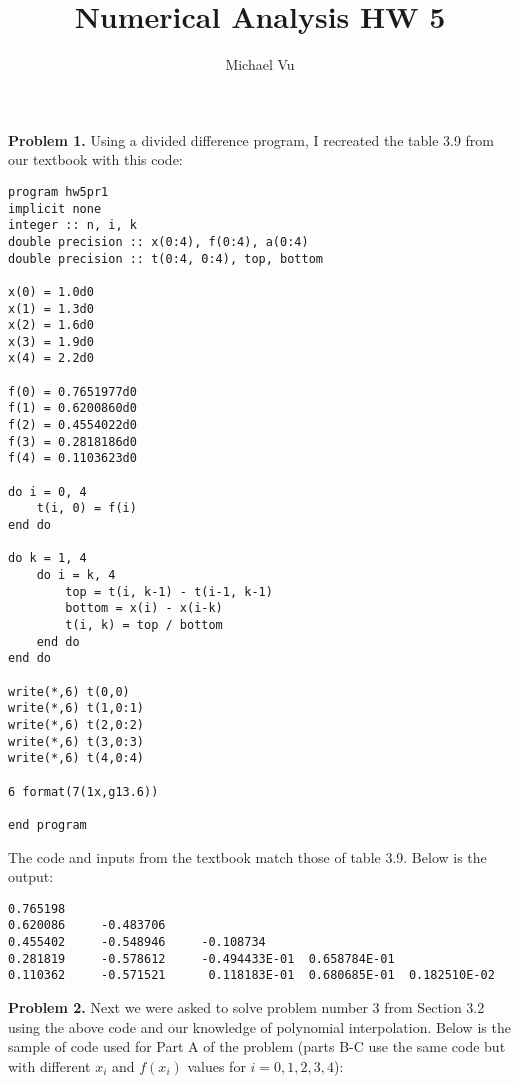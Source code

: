 \documentclass[12pt]{article}
\author{Michael Vu}
\title{Numerical Analysis HW 5}
\begin{document}
\maketitle 

\textbf{Problem 1.} Using a divided difference program, I recreated the table 3.9 from our textbook with this code:

\begin{verbatim}
program hw5pr1
implicit none
integer :: n, i, k
double precision :: x(0:4), f(0:4), a(0:4)
double precision :: t(0:4, 0:4), top, bottom

x(0) = 1.0d0
x(1) = 1.3d0
x(2) = 1.6d0
x(3) = 1.9d0
x(4) = 2.2d0

f(0) = 0.7651977d0
f(1) = 0.6200860d0
f(2) = 0.4554022d0
f(3) = 0.2818186d0
f(4) = 0.1103623d0

do i = 0, 4 
	t(i, 0) = f(i)
end do

do k = 1, 4 
	do i = k, 4 
		top = t(i, k-1) - t(i-1, k-1)
		bottom = x(i) - x(i-k)
		t(i, k) = top / bottom
	end do
end do

write(*,6) t(0,0)
write(*,6) t(1,0:1)
write(*,6) t(2,0:2)
write(*,6) t(3,0:3)
write(*,6) t(4,0:4)

6 format(7(1x,g13.6))

end program
\end{verbatim}

The code and inputs from the textbook match those of table 3.9. Below is the output:

\begin{verbatim}
0.765198
0.620086     -0.483706
0.455402     -0.548946     -0.108734
0.281819     -0.578612     -0.494433E-01  0.658784E-01
0.110362     -0.571521      0.118183E-01  0.680685E-01  0.182510E-02
\end{verbatim}

\bigskip

\textbf{Problem 2.} Next we were asked to solve problem number 3 from Section 3.2 using the above code and our knowledge of polynomial interpolation. Below is the sample of code used for Part A of the problem (parts B-C use the same code but with different $x_i$ and $f(x_i)$ values for $i=0,1,2,3,4$):
\end{document}
